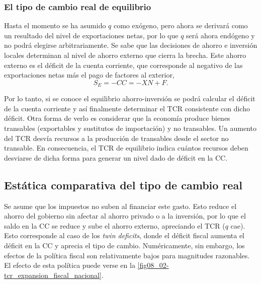 \documentclass[DeGregorioResumen]{subfiles}
\begin{document}
\subsubsection{El tipo de cambio real de equilibrio}

Hasta el momento se ha asumido $q$ como exógeno, pero ahora se derivará como un resultado del nivel de exportaciones netas, por lo que $q$ será ahora endógeno y no podrá elegirse arbitrariamente. Se sabe que las decisiones de ahorro e inversión locales determinan al nivel de ahorro externo que cierra la brecha. Este ahorro externo es el déficit de la cuenta corriente, que corresponde al negativo de las exportaciones netas más el pago de factores al exterior,
\[
S_E = -CC = -XN + F.
\]

Por lo tanto, si  se conoce el equilibrio ahorro-inversión se podrá calcular el déficit de la cuenta corriente y así finalmente determinar el TCR consistente con dicho déficit. Otra forma de verlo es considerar que la economía produce bienes transables (exportables y sustitutos de importación) y no transables. Un aumento del TCR desvía recursos a la producción de transables desde el sector no transable. En consecuencia, el TCR de equilibrio indica cuántos recursos deben desviarse de dicha forma para generar un nivel dado de déficit en la CC.



\subsection{Estática comparativa del tipo de cambio real}


Se asume que los impuestos no suben al financiar este gasto. Esto reduce el ahorro del gobierno sin afectar al ahorro privado o a la inversión, por lo que el saldo en la CC se reduce y sube el ahorro externo, apreciando el TCR ($q$ cae). Esto corresponde al caso de los \textit{twin deficits}, donde el déficit fiscal aumenta el déficit en la CC y aprecia el tipo de cambio. Numéricamente, sin embargo, los efectos de la política fiscal son relativamente bajos para magnitudes razonables. El efecto de esta política puede verse en la \autoref{fig08_02-tcr_expansion_fiscal_nacional}.
\end{document}

